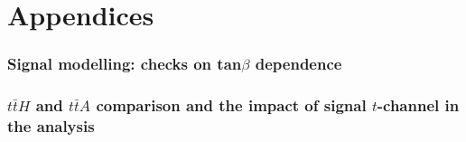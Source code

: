 \documentclass[NOTE, atlasdraft=true, texlive=2016, UKenglish]{atlasdoc}
\begin{document}
\printbibliography
% 
% 


\clearpage
\appendix
\part*{Appendices}

\FloatBarrier
\section{Signal modelling: checks on tan$\beta$ dependence}
\label{app:tan_beta_dep}


\FloatBarrier
\section{$t\bar{t}H$ and $t\bar{t}A$ comparison and the impact of signal $t$-channel in the analysis}
\label{app:t_channel}


\FloatBarrier
\end{document}
